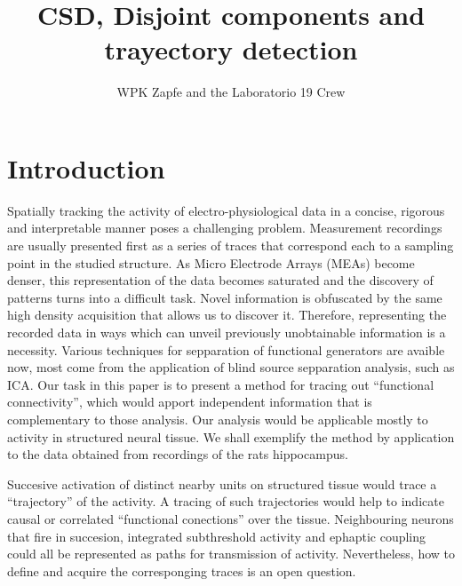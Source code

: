 \documentclass{article}
\author{WPK Zapfe and the Laboratorio 19 Crew}
\title{CSD, Disjoint components and trayectory detection}
\begin{document}
\maketitle

\section{Introduction}

Spatially tracking the activity of electro-physiological data in a concise, rigorous and interpretable manner poses a challenging problem. Measurement recordings are usually presented first as a series of traces that correspond each to a sampling point in the studied structure. As Micro Electrode Arrays (MEAs) become denser, this representation of the data becomes saturated and the discovery of patterns turns into a difficult task. Novel information is obfuscated by the same high density acquisition that allows us to discover it. Therefore, representing  the recorded data in ways which can unveil previously unobtainable information is a necessity. Various techniques for sepparation of functional generators are avaible now, most come from the application of blind source sepparation analysis, such as ICA. 
Our task in this paper is to present a method for tracing out ``functional connectivity'', which would apport independent information that is complementary to those analysis.  Our  analysis would be applicable mostly to activity in structured neural tissue. We shall exemplify the method by application to the data obtained from recordings of the rats hippocampus. 

Succesive activation  of distinct nearby units on structured tissue would trace a ``trajectory'' of the activity. A tracing of such trajectories would help to indicate causal or correlated ``functional conections'' over the tissue. Neighbouring neurons that fire in succesion, integrated subthreshold activity and ephaptic coupling could all be represented as paths for transmission of activity. Nevertheless, how to define and acquire the corresponging traces is an open question.
\end{document}
